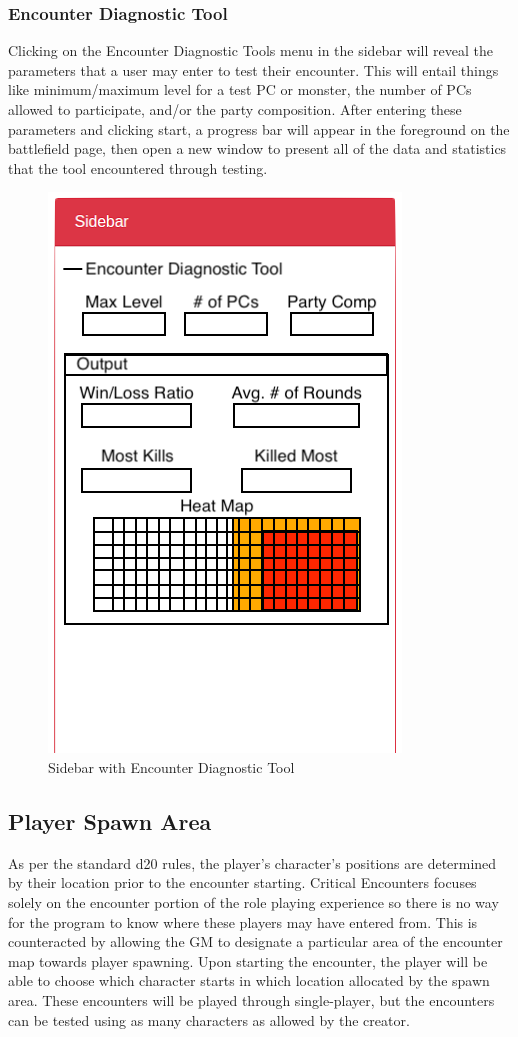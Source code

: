 \documentclass[12pt,a4paper]{report}
\begin{document}
			\subsubsection{Encounter Diagnostic Tool}
			Clicking on the Encounter Diagnostic Tools menu in the sidebar will reveal the parameters that a user may enter to test their encounter. This will entail things like minimum/maximum level for a test PC or monster, the number of PCs allowed to participate, and/or the party composition. After entering these parameters and clicking start, a progress bar will appear in the foreground on the battlefield page, then open a new window to present all of the data and statistics that the tool encountered through testing.
			\bigskip
			\begin{figure}[H]
				\centering
				\includegraphics[scale=.7]{sidebarencounterdiagnostic}
				\caption{Sidebar with Encounter Diagnostic Tool}
				\label{fig: Sidebar with Encounter Diagnostic Tool}
			\end{figure}
		\newpage
		\subsection{Player Spawn Area}
		As per the standard d20 rules, the player's character's positions are determined by their location prior to the encounter starting. Critical Encounters focuses solely on the encounter portion of the role playing experience so there is no way for the program to know where these players may have entered from. This is counteracted by allowing the GM to designate a particular area of the encounter map towards player spawning. Upon starting the encounter, the player will be able to choose which character starts in which location allocated by the spawn area. These encounters will be played through single-player, but the encounters can be tested using as many characters as allowed by the creator.
\end{document}
